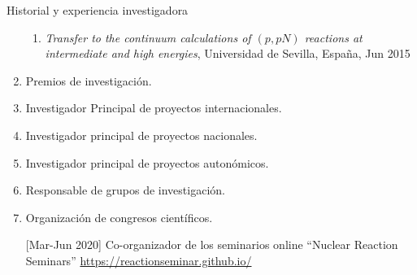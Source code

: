 \documentclass{resume2} %
\begin{document}
\begin{rSection}{Historial y experiencia investigadora}
\begin{enumerate}[label=\alph*.]
\begin{enumerate}[label=\arabic*.]



\item {\it Transfer to the continuum calculations of $(p,pN)$ reactions at intermediate and high energies}, Universidad de Sevilla, Espa\~na, Jun 2015

\end{enumerate}


\item Premios de investigación.

\item Investigador Principal de proyectos internacionales.

\item  Investigador principal de proyectos nacionales.

\item Investigador principal de proyectos autonómicos.

\item Responsable de grupos de investigación.

\item Organización de congresos científicos.

[Mar-Jun 2020] Co-organizador de los seminarios online ``Nuclear Reaction Seminars'' \url{https://reactionseminar.github.io/}

\end{enumerate}
\end{rSection}
\end{document}
